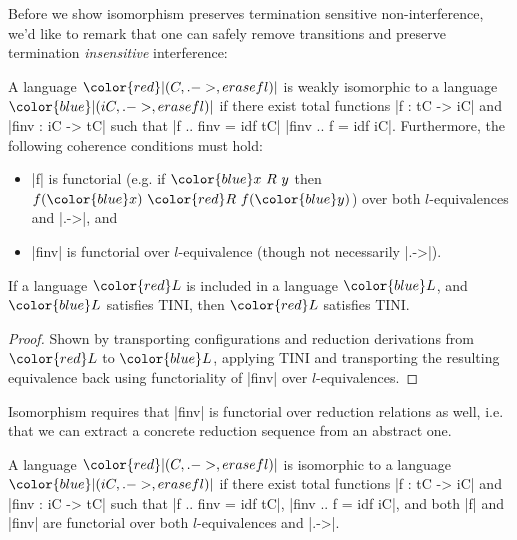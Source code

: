 \newcommand{\con}[1]{\ensuremath{{\color{red} #1}}}
\newcommand{\abs}[1]{\ensuremath{{\color{blue} #1}}}

Before we show isomorphism preserves termination sensitive
non-interference, we'd like to remark that one can safely remove transitions
and preserve termination \emph{insensitive} interference:

\begin{definition}
    A language \con{|(C, .->, erasef l)|} is weakly isomorphic to a
    language \abs{|(iC, .->, erasef l)|} if there exist total functions
    |f : tC -> iC| and |finv : iC -> tC| such that |f .. finv = idf tC|
    |finv .. f = idf iC|.  Furthermore, the following coherence conditions
    must hold:
    \begin{itemize}
        \item |f| is functorial (e.g. if $\abs{x\ R\ y}$ then
            $f(\abs{x})\ \con{R}\ f(\abs{y})$) over both
            $l$-equivalences and |.->|, and
        \item |finv| is functorial over $l$-equivalence (though not necessarily |.->|).
    \end{itemize}
\end{definition}

\begin{theorem}
    If a language \con{L} is included in a language \abs{L}, and \abs{L}
    satisfies TINI, then \con{L} satisfies TINI.
\end{theorem}

\begin{proof}
    Shown by transporting configurations and reduction derivations
    from \con{L} to \abs{L}, applying TINI and transporting the resulting
    equivalence back using functoriality of |finv| over $l$-equivalences.
\end{proof}

Isomorphism requires that |finv| is functorial over reduction relations
as well, i.e. that we can extract a concrete reduction sequence from an abstract one.

\begin{definition}
    A language \con{|(C, .->, erasef l)|} is
    isomorphic to a language \abs{|(iC, .->, erasef l)|} if there exist total functions
    |f : tC -> iC| and |finv : iC -> tC| such that |f .. finv = idf tC|, |finv .. f = idf iC|, and both |f| and |finv| are
    functorial over both $l$-equivalences and |.->|.
\end{definition}

